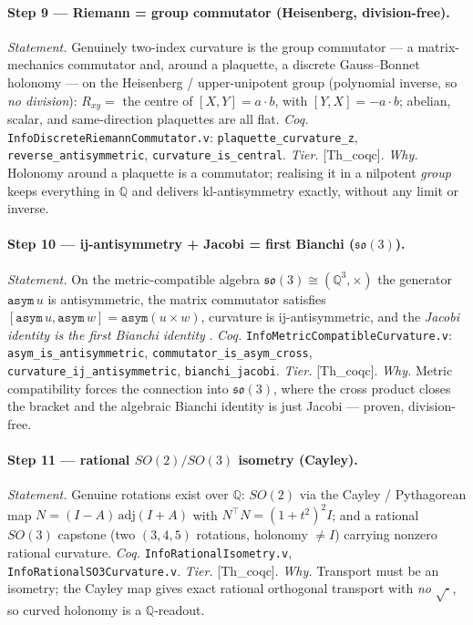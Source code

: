 \documentclass[10pt,twocolumn]{article}
\theoremstyle{definition}
\newcommand{\Thq}{\textsf{[Th\_coqc]}}   %
\newcommand{\code}[1]{\texttt{#1}}
\begin{document}
\paragraph{Step 9 --- Riemann = group commutator (Heisenberg, division-free).}
\emph{Statement.} Genuinely two-index curvature is the group commutator --- a matrix-mechanics
commutator \cite{bornjordan1925,heisenberg1927} and, around a plaquette, a
discrete Gauss--Bonnet holonomy \cite{gauss1828,bonnet1848} --- on the
Heisenberg / upper-unipotent group (polynomial inverse, so \emph{no division}):
$R_{xy}=$ the centre of $[X,Y]=a\cdot b$, with $[Y,X]=-a\cdot b$; abelian,
scalar, and same-direction plaquettes are all flat. \emph{Coq.}
\code{InfoDiscreteRiemannCommutator.v}: \code{plaquette\_curvature\_z},
\code{reverse\_antisymmetric}, \code{curvature\_is\_central}. \emph{Tier.}
\Thq{}. \emph{Why.} Holonomy around a plaquette is a commutator; realising it in
a nilpotent \emph{group} keeps everything in $\mathbb{Q}$ and delivers
kl-antisymmetry exactly, without any limit or inverse.

\paragraph{Step 10 --- ij-antisymmetry + Jacobi = first Bianchi ($\mathfrak{so}(3)$).}
\emph{Statement.} On the metric-compatible algebra $\mathfrak{so}(3)\cong
(\mathbb{Q}^3,\times)$ the generator $\code{asym}\,u$ is antisymmetric, the
matrix commutator satisfies $[\code{asym}\,u,\code{asym}\,w]=\code{asym}(u\times
w)$, curvature is ij-antisymmetric, and the \emph{Jacobi identity is the first
Bianchi identity} \cite{bianchi1902}. \emph{Coq.} \code{InfoMetricCompatibleCurvature.v}:
\code{asym\_is\_antisymmetric}, \code{commutator\_is\_asym\_cross},
\code{curvature\_ij\_antisymmetric}, \code{bianchi\_jacobi}. \emph{Tier.} \Thq{}.
\emph{Why.} Metric compatibility forces the connection into $\mathfrak{so}(3)$,
where the cross product closes the bracket and the algebraic Bianchi identity is
just Jacobi --- proven, division-free.

\paragraph{Step 11 --- rational $SO(2)/SO(3)$ isometry (Cayley).}
\emph{Statement.} Genuine rotations exist over $\mathbb{Q}$: $SO(2)$ via the
Cayley / Pythagorean map \cite{cayley1846} $N=(I-A)\,\mathrm{adj}(I+A)$ with $N^{\!\top}N=(1+t^2)^2
I$; and a rational $SO(3)$ capstone (two $(3,4,5)$ rotations, holonomy $\neq I$)
carrying nonzero rational curvature. \emph{Coq.} \code{InfoRationalIsometry.v},
\code{InfoRationalSO3Curvature.v}. \emph{Tier.} \Thq{}. \emph{Why.} Transport
must be an isometry; the Cayley map gives exact rational orthogonal transport
with \emph{no} $\sqrt{\cdot}$, so curved holonomy is a $\mathbb{Q}$-readout.
\end{document}
